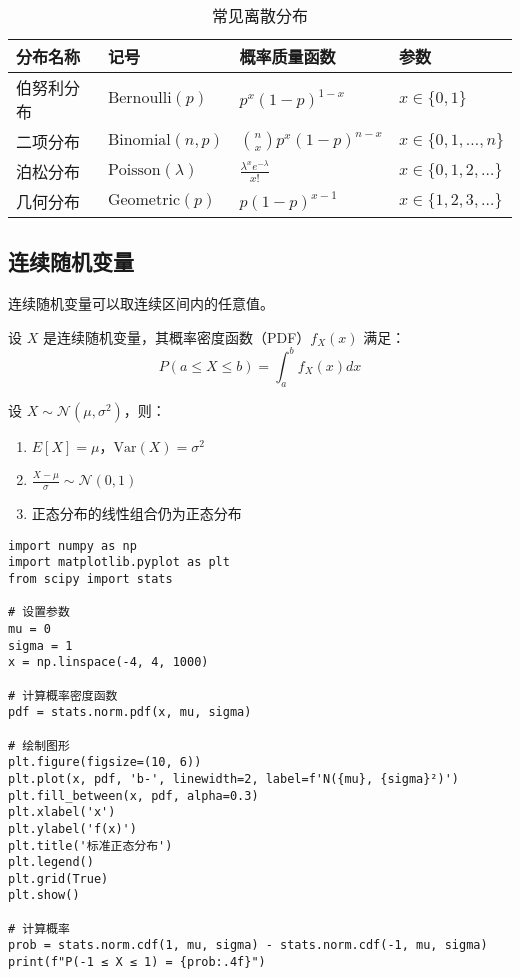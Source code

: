 \begin{table}[htbp]
    \centering
    \caption{常见离散分布}
    \label{tab:discrete-distributions}
    \begin{tabular}{@{}llll@{}}
        \toprule
        分布名称 & 记号 & 概率质量函数 & 参数 \\
        \midrule
        伯努利分布 & $\text{Bernoulli}(p)$ & $p^x(1-p)^{1-x}$ & $x \in \{0,1\}$ \\
        二项分布 & $\text{Binomial}(n,p)$ & $\binom{n}{x}p^x(1-p)^{n-x}$ & $x \in \{0,1,\ldots,n\}$ \\
        泊松分布 & $\text{Poisson}(\lambda)$ & $\frac{\lambda^x e^{-\lambda}}{x!}$ & $x \in \{0,1,2,\ldots\}$ \\
        几何分布 & $\text{Geometric}(p)$ & $p(1-p)^{x-1}$ & $x \in \{1,2,3,\ldots\}$ \\
        \bottomrule
    \end{tabular}
\end{table}

\subsection{连续随机变量}

连续随机变量可以取连续区间内的任意值。

\begin{definition}[概率密度函数]\label{def:pdf}
设 $X$ 是连续随机变量，其概率密度函数（PDF）$f_X(x)$ 满足：
\[
P(a \leq X \leq b) = \int_a^b f_X(x) dx
\]
\end{definition}

\begin{theorem}[正态分布的性质]\label{thm:normal-distribution}
设 $X \sim \mathcal{N}(\mu, \sigma^2)$，则：
\begin{enumerate}
    \item $E[X] = \mu$，$\text{Var}(X) = \sigma^2$
    \item $\frac{X - \mu}{\sigma} \sim \mathcal{N}(0, 1)$
    \item 正态分布的线性组合仍为正态分布
\end{enumerate}
\end{theorem}

\begin{codebox}[title=正态分布的 Python 实现]
\begin{verbatim}
import numpy as np
import matplotlib.pyplot as plt
from scipy import stats

# 设置参数
mu = 0
sigma = 1
x = np.linspace(-4, 4, 1000)

# 计算概率密度函数
pdf = stats.norm.pdf(x, mu, sigma)

# 绘制图形
plt.figure(figsize=(10, 6))
plt.plot(x, pdf, 'b-', linewidth=2, label=f'N({mu}, {sigma}²)')
plt.fill_between(x, pdf, alpha=0.3)
plt.xlabel('x')
plt.ylabel('f(x)')
plt.title('标准正态分布')
plt.legend()
plt.grid(True)
plt.show()

# 计算概率
prob = stats.norm.cdf(1, mu, sigma) - stats.norm.cdf(-1, mu, sigma)
print(f"P(-1 ≤ X ≤ 1) = {prob:.4f}")
\end{verbatim}
\end{codebox}

